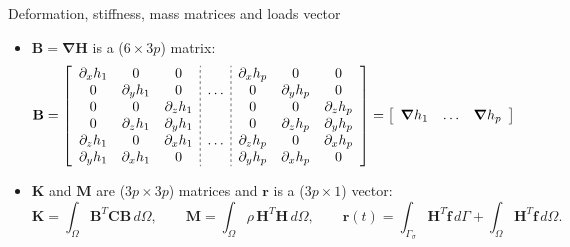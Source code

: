 \documentclass[aspectratio=169]{beamer}
\begin{document}
\begin{frame}{Deformation, stiffness, mass matrices and loads vector}
  \begin{itemize}
    \item $\mathbf B=\boldsymbol\nabla\mathbf H$ is a ($6\times 3p$) matrix:
          \begin{align*}
            \mathbf B
            =\left[
              \begin{array}{ccc;{2pt/2pt}c;{2pt/2pt}ccc}
                \partial_xh_{1} & 0               & 0               &       & \partial_xh_{p} & 0               & 0               \\
                0               & \partial_yh_{1} & 0               & \dots & 0               & \partial_yh_{p} & 0               \\
                0               & 0               & \partial_zh_{1} &       &
                0               & 0               & \partial_zh_{p}                                                               \\
                0               & \partial_zh_{1} & \partial_yh_{1} &       &
                0               & \partial_zh_{p} & \partial_yh_{p}                                                               \\
                \partial_zh_{1} & 0               & \partial_xh_{1} & \dots & \partial_zh_{p} & 0               & \partial_xh_{p} \\
                \partial_yh_{1} & \partial_xh_{1} & 0               &       & \partial_yh_{p} & \partial_xh_{p} & 0               \\
              \end{array} \right]
            =\left[
              \begin{array}{c;{2pt/2pt}c;{2pt/2pt}c}
                \boldsymbol\nabla h_1 & \dots & \boldsymbol\nabla h_p
              \end{array} \right]
          \end{align*}
          \vspace{0.1cm}
    \item $\mathbf K$ and $\mathbf M$ are ($3p\times 3p$) matrices and $\mathbf r$ is a ($3p\times 1$) vector:
          \[
            \mathbf K =\int_\Omega \mathbf B^T\mathbf C\mathbf B \, d\Omega,\qquad \mathbf M =\int_\Omega \rho\, \mathbf H^T\mathbf H \, d\Omega,\qquad \mathbf r(t)=\int_{\Gamma_\sigma} \mathbf H^{T}\mathbf{\hat f} \, d\Gamma+\int_{\Omega} \mathbf H^{T}\mathbf f\, d\Omega.
          \]
  \end{itemize}
\end{frame}
\end{document}

